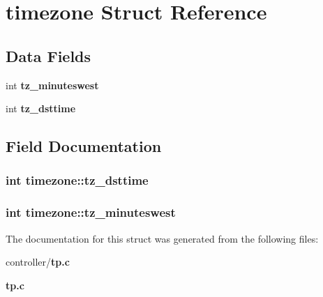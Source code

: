 \section{timezone Struct Reference}
\label{structtimezone}
\subsection*{Data Fields}
\begin{DoxyCompactItemize}
\item 
int {\bf tz\_\-minuteswest}
\item 
int {\bf tz\_\-dsttime}
\end{DoxyCompactItemize}


\subsection{Field Documentation}
\subsubsection[{tz\_\-dsttime}]{\setlength{\rightskip}{0pt plus 5cm}int {\bf timezone::tz\_\-dsttime}}\label{structtimezone_a85259977aeb63b17e6ce94f19afdfd99}
\subsubsection[{tz\_\-minuteswest}]{\setlength{\rightskip}{0pt plus 5cm}int {\bf timezone::tz\_\-minuteswest}}\label{structtimezone_a3042f7eff6e1b980728def76b1fa0eb7}


The documentation for this struct was generated from the following files:\begin{DoxyCompactItemize}
\item 
controller/{\bf tp.c}\item 
{\bf tp.c}\end{DoxyCompactItemize}

